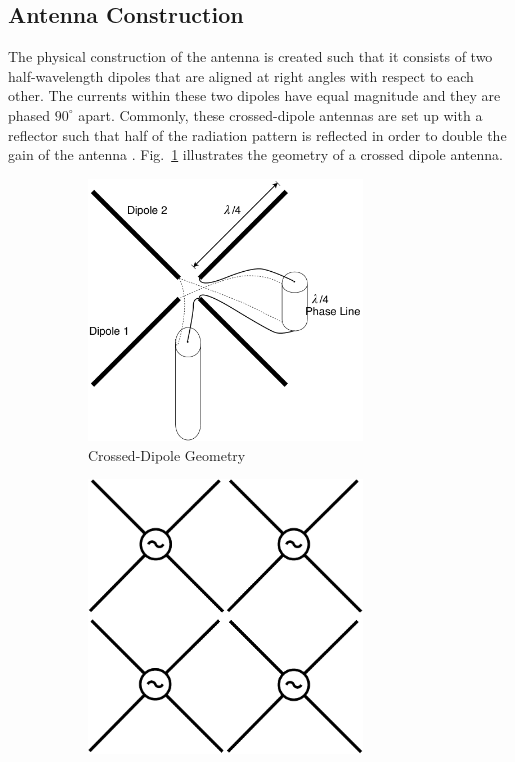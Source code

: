 \documentclass[11pt]{witseiepaper}
\begin{document}
\begin{bibunit}[witseie]
\subsection{Antenna Construction} \label{sec:AntennaConstruction}
The physical construction of the antenna is created such that it consists of two half-wavelength dipoles that are aligned at right angles with respect to each other. The currents within these two dipoles have equal magnitude and they are phased $90^{\circ}$ apart.
Commonly, these crossed-dipole antennas are set up with a reflector such that half of the radiation pattern is reflected in order to double the gain of the antenna \cite[p.~108]{IEEECrossedDipole}.
Fig.~\ref{fig:Crossed-DipoleGeometry} illustrates the geometry of a crossed dipole antenna.
\begin{figure}[htb]
    \centering
    \begin{subfigure}{.3\textwidth}
        \centering
            \includegraphics[width=0.8\textwidth]{Crossed-Dipole.pdf}
            \caption{Crossed-Dipole Geometry}
            \label{fig:Crossed-DipoleGeometry} 
        \end{subfigure}%
        \begin{subfigure}{.3\textwidth}
            \centering
            \includegraphics[width=0.8\textwidth]{ArrayGeometry.pdf}

\end{subfigure}
\end{figure}
\end{bibunit}
\end{document}

